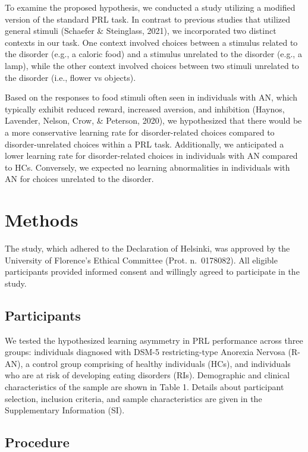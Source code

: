 \documentclass[
  man,floatsintext]{apa6}
\begin{document}
To examine the proposed hypothesis, we conducted a study utilizing a modified version of the standard PRL task. In contrast to previous studies that utilized general stimuli (Schaefer \& Steinglass, 2021), we incorporated two distinct contexts in our task. One context involved choices between a stimulus related to the disorder (e.g., a caloric food) and a stimulus unrelated to the disorder (e.g., a lamp), while the other context involved choices between two stimuli unrelated to the disorder (i.e., flower vs objects).

Based on the responses to food stimuli often seen in individuals with AN, which typically exhibit reduced reward, increased aversion, and inhibition (Haynos, Lavender, Nelson, Crow, \& Peterson, 2020), we hypothesized that there would be a more conservative learning rate for disorder-related choices compared to disorder-unrelated choices within a PRL task. Additionally, we anticipated a lower learning rate for disorder-related choices in individuals with AN compared to HCs. Conversely, we expected no learning abnormalities in individuals with AN for choices unrelated to the disorder.

\hypertarget{methods}{%
\section{Methods}\label{methods}}

The study, which adhered to the Declaration of Helsinki, was approved by the University of Florence's Ethical Committee (Prot. n.~0178082). All eligible participants provided informed consent and willingly agreed to participate in the study.

\hypertarget{participants}{%
\subsection{Participants}\label{participants}}

We tested the hypothesized learning asymmetry in PRL performance across three groups: individuals diagnosed with DSM-5 restricting-type Anorexia Nervosa (R-AN), a control group comprising of healthy individuals (HCs), and individuals who are at risk of developing eating disorders (RIs). Demographic and clinical characteristics of the sample are shown in Table 1. Details about participant selection, inclusion criteria, and sample characteristics are given in the Supplementary Information (SI).

\hypertarget{procedure}{%
\subsection{Procedure}\label{procedure}}
\end{document}
